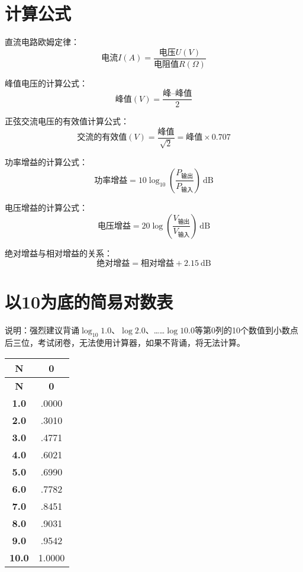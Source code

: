 \newpage

\section{计算公式}

直流电路欧姆定律：
$$\mbox{电流}I(A)=\frac{\mbox{电压}U(V)}{\mbox{电阻值}R(\Omega)}$$

峰值电压的计算公式：
$$\mbox{峰值}(V)=\frac{\mbox{峰--峰值}}{2}$$

正弦交流电压的有效值计算公式：
$$\mbox{交流的有效值}(V)=\frac{\mbox{峰值}}{\sqrt{2}}=\mbox{峰值}\times0.707$$

功率增益的计算公式：
$$\mbox{功率增益}=10 \log_{10} \left( {\frac{P_{ \mbox{输出} }}{P_{ \mbox{输入} }}}\right)\ \mathrm{dB}$$

电压增益的计算公式：
$$\mbox{电压增益}=20 \log \left( {\frac{V_{ \mbox{输出} }}{V_{ \mbox{输入} }}} \right)\ \mathrm{dB}$$


绝对增益与相对增益的关系：
$$\mbox{绝对增益} = \mbox{相对增益} + 2.15 \ \mathrm{dB}$$

\newpage


\section{以10为底的简易对数表}

说明：强烈建议背诵$\log_{10} 1.0$、$\log 2.0$、……$\log 10.0$等第0列的10个数值到小数点后三位，考试闭卷，无法使用计算器，如果不背诵，将无法计算。

\begin{longtable}[c]{|c|c|}
\hline
\textbf{N} & \textbf{0} \\
\hline
\endfirsthead
\hline
\textbf{N} & \textbf{0} \\
\endhead
\textbf{1.0} & .0000 \\ \hline
\textbf{2.0} & .3010 \\ \hline
\textbf{3.0} & .4771 \\ \hline
\textbf{4.0} & .6021 \\ \hline
\textbf{5.0} & .6990 \\ \hline
\textbf{6.0} & .7782 \\ \hline
\textbf{7.0} & .8451 \\ \hline
\textbf{8.0} & .9031 \\ \hline
\textbf{9.0} & .9542 \\ \hline
\textbf{10.0} & 1.0000 \\ \hline
\end{longtable}


